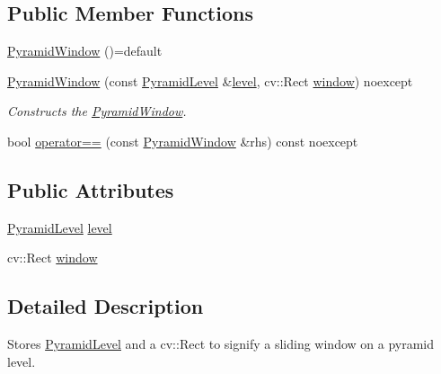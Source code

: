 \subsection*{Public Member Functions}
\begin{DoxyCompactItemize}
\item 
\hyperlink{structdg_1_1deepcore_1_1imagery_1_1_pyramid_window_a48de48c808a43eeac92353441cddaba4}{Pyramid\+Window} ()=default
\item 
\hyperlink{group___imagery_module_ga96c7cf53df8e5ca33d62bc9ec25215b5}{Pyramid\+Window} (const \hyperlink{structdg_1_1deepcore_1_1imagery_1_1_pyramid_level}{Pyramid\+Level} \&\hyperlink{structdg_1_1deepcore_1_1imagery_1_1_pyramid_window_aa08adb03843e4cd955b767c82d54e335}{level}, cv\+::\+Rect \hyperlink{structdg_1_1deepcore_1_1imagery_1_1_pyramid_window_aa7e015320172969330a744d0da0c5ad3}{window}) noexcept
\begin{DoxyCompactList}\small\item\em Constructs the \hyperlink{structdg_1_1deepcore_1_1imagery_1_1_pyramid_window}{Pyramid\+Window}. \end{DoxyCompactList}\item 
bool \hyperlink{structdg_1_1deepcore_1_1imagery_1_1_pyramid_window_adc779a66c293a26526d342227433c10e}{operator==} (const \hyperlink{structdg_1_1deepcore_1_1imagery_1_1_pyramid_window}{Pyramid\+Window} \&rhs) const noexcept
\end{DoxyCompactItemize}
\subsection*{Public Attributes}
\begin{DoxyCompactItemize}
\item 
\hyperlink{structdg_1_1deepcore_1_1imagery_1_1_pyramid_level}{Pyramid\+Level} \hyperlink{structdg_1_1deepcore_1_1imagery_1_1_pyramid_window_aa08adb03843e4cd955b767c82d54e335}{level}
\item 
cv\+::\+Rect \hyperlink{structdg_1_1deepcore_1_1imagery_1_1_pyramid_window_aa7e015320172969330a744d0da0c5ad3}{window}
\end{DoxyCompactItemize}


\subsection{Detailed Description}
Stores \hyperlink{structdg_1_1deepcore_1_1imagery_1_1_pyramid_level}{Pyramid\+Level} and a cv\+::\+Rect to signify a sliding window on a pyramid level. 

